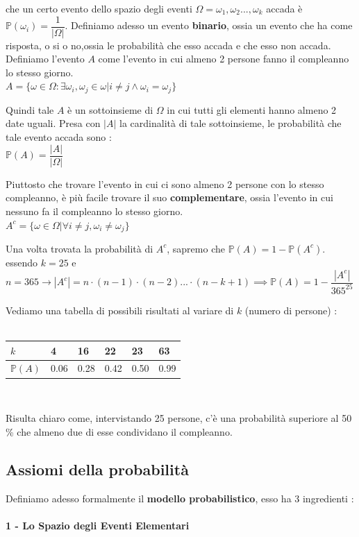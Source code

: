 \documentclass[12pt, letterpaper]{article}
\begin{document}
che un certo evento dello spazio degli eventi \(\Omega={\omega_1,\omega_2...,\omega_k }\) accada è \(\mathbb{P}({\omega_i})=\dfrac{1}{|\Omega|}\).
Definiamo adesso un evento \textbf{binario}, ossia un evento che ha come risposta, o si o no,ossia le probabilità che 
esso accada e che esso non accada. Definiamo l'evento \(A\) come l'evento in cui almeno 2 persone fanno il compleanno
lo stesso giorno.\\
\centering\( A=\{\omega \in \Omega :\exists \omega_i,\omega_j \in \omega | i\ne j \land \omega_i=\omega_j\} \)\\
\raggedright
Quindi tale \(A\) è un sottoinsieme di \(\Omega\) in cui tutti gli elementi hanno almeno 2 date uguali. 
Presa con \(|A|\) la cardinalità di tale sottoinsieme, le probabilità che tale evento accada sono :\\
\centering\( \mathbb{P}(A)=\dfrac{|A|}{|\Omega|} \)\\
\raggedright Piuttosto che trovare l'evento in cui ci sono almeno 2 persone con lo stesso  compleanno,
è più facile trovare il suo \textbf{complementare}, ossia l'evento in cui nessuno fa il compleanno lo stesso giorno.
\\\centering\( A^c=\{\omega \in \Omega | \forall i\ne j, \omega_i \ne \omega_j\} \)\\
\raggedright Una volta trovata la probabilità di \(A^c\), sapremo che \(\mathbb{P}(A)=1-\mathbb{P}(A^c)\).
\\\centering essendo \(k=25 \) e \( n=365 \rightarrow |A^c|=n \cdot (n-1) \cdot (n-2)...\cdot (n-k+1)  \implies
 \mathbb{P} (A)=1-\dfrac{|A^c|}{365^{25}}\)  \\
\raggedright Vediamo una tabella di possibili risultati al variare di \(k\) (numero di persone) :\\\hphantom{.}\\
\centering
    \begin{tabular}{|l|l|l|l|l|l|}
    \hline
    \(k\)  & 4    & 16   & 22   & 23   & 63   \\ \hline
    \(\mathbb{P}(A)\) & 0.06 & 0.28 & 0.42 & 0.50 & 0.99 \\ \hline
    \end{tabular}
\\\raggedright
 Risulta chiaro come, intervistando 25 persone, c'è una probabilità superiore 
al 50 \% che almeno due di esse condividano il compleanno.
\subsection{Assiomi della probabilità}
Definiamo adesso formalmente il \textbf{modello probabilistico}, esso ha 3 ingredienti :
\\\hphantom{.}\\\textbf{1 - Lo Spazio degli Eventi Elementari}
\end{document}

